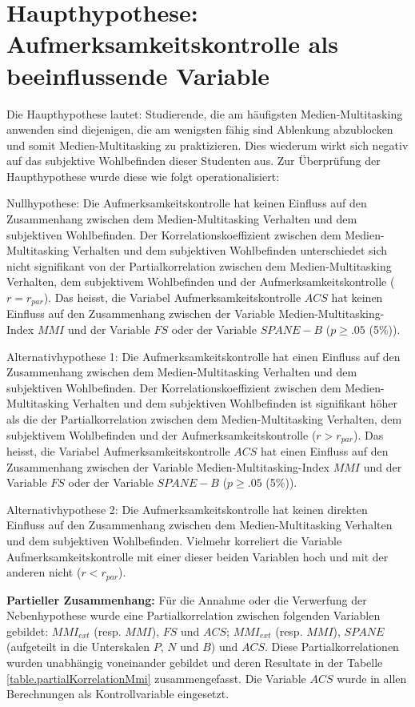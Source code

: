 \section{Haupthypothese: Aufmerksamkeitskontrolle als beeinflussende Variable}\label{label.ergebnisse.haupthypothese}
Die Haupthypothese lautet: Studierende, die am häufigsten Medien-Multitasking anwenden sind diejenigen, die am wenigsten fähig sind Ablenkung abzublocken und somit Medien-Multitasking zu praktizieren. Dies wiederum wirkt sich negativ auf das subjektive Wohlbefinden dieser Studenten aus. Zur Überprüfung der Haupthypothese wurde diese wie folgt operationalisiert:\par
Nullhypothese: Die Aufmerksamkeitskontrolle hat keinen Einfluss auf den Zusammenhang zwischen dem Medien-Multitasking Verhalten und dem subjektiven Wohlbefinden. Der Korrelationskoeffizient zwischen dem Medien-Multitasking Verhalten und dem subjektiven Wohlbefinden unterschiedet sich nicht signifikant von der Partialkorrelation zwischen dem Medien-Multitasking Verhalten, dem subjektivem Wohlbefinden und der Aufmerksamkeitskontrolle ($r=r_{par}$). Das heisst, die Variabel Aufmerksamkeitskontrolle $ACS$ hat keinen Einfluss auf den Zusammenhang zwischen der Variable Medien-Multitasking-Index $MMI$ und der Variable $FS$ oder der Variable $SPANE-B$ ($p \geq .05$ (5\%)). 
\par
Alternativhypothese 1: Die Aufmerksamkeitskontrolle hat einen Einfluss auf den Zusammenhang zwischen dem Medien-Multitasking Verhalten und dem subjektiven Wohlbefinden. Der Korrelationskoeffizient zwischen dem Medien-Multitasking Verhalten und dem subjektiven Wohlbefinden ist signifikant höher als die der Partialkorrelation zwischen dem Medien-Multitasking Verhalten, dem subjektivem Wohlbefinden und der Aufmerksamkeitskontrolle ($r>r_{par}$). Das heisst, die Variabel Aufmerksamkeitskontrolle $ACS$ hat einen Einfluss auf den Zusammenhang zwischen der Variable Medien-Multitasking-Index $MMI$ und der Variable $FS$ oder der Variable $SPANE-B$ ($p \geq .05$ (5\%)). \par
Alternativhypothese 2: Die Aufmerksamkeitskontrolle hat keinen direkten Einfluss auf den Zusammenhang zwischen dem Medien-Multitasking Verhalten und dem subjektiven Wohlbefinden. 
Vielmehr korreliert die Variable Aufmerksamkeitskontrolle mit einer dieser beiden Variablen hoch und mit der anderen nicht ($r<r_{par}$). \par
\textbf{Partieller Zusammenhang:}
Für die Annahme oder die Verwerfung der Nebenhypothese wurde eine Partialkorrelation zwischen folgenden Variablen gebildet: $MMI_{ext}$ (resp. $MMI$), $FS$ und $ACS$; $MMI_{ext}$ (resp. $MMI$), $SPANE$ (aufgeteilt in die Unterskalen $P$, $N$ und $B$) und $ACS$. Diese Partialkorrelationen wurden unabhängig voneinander gebildet und deren Resultate in der Tabelle \ref{table.partialKorrelationMmi} zusammengefasst. Die Variable $ACS$ wurde in allen Berechnungen als Kontrollvariable eingesetzt.\\

